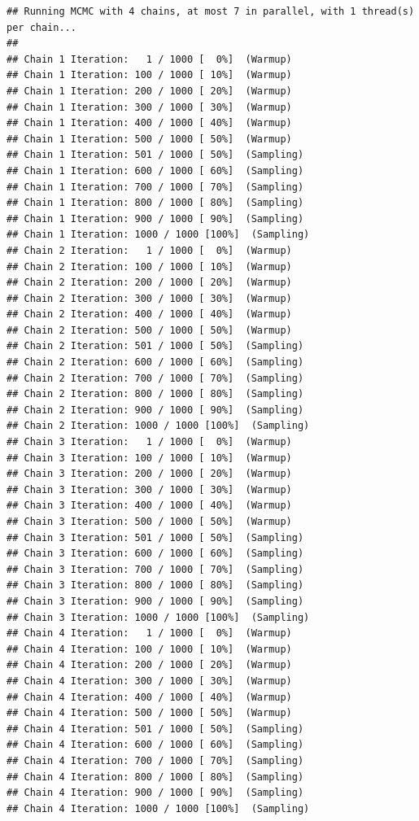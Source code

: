 \documentclass[
]{article}
\begin{document}
\begin{verbatim}
## Running MCMC with 4 chains, at most 7 in parallel, with 1 thread(s) per chain...
## 
## Chain 1 Iteration:   1 / 1000 [  0%]  (Warmup) 
## Chain 1 Iteration: 100 / 1000 [ 10%]  (Warmup) 
## Chain 1 Iteration: 200 / 1000 [ 20%]  (Warmup) 
## Chain 1 Iteration: 300 / 1000 [ 30%]  (Warmup) 
## Chain 1 Iteration: 400 / 1000 [ 40%]  (Warmup) 
## Chain 1 Iteration: 500 / 1000 [ 50%]  (Warmup) 
## Chain 1 Iteration: 501 / 1000 [ 50%]  (Sampling) 
## Chain 1 Iteration: 600 / 1000 [ 60%]  (Sampling) 
## Chain 1 Iteration: 700 / 1000 [ 70%]  (Sampling) 
## Chain 1 Iteration: 800 / 1000 [ 80%]  (Sampling) 
## Chain 1 Iteration: 900 / 1000 [ 90%]  (Sampling) 
## Chain 1 Iteration: 1000 / 1000 [100%]  (Sampling) 
## Chain 2 Iteration:   1 / 1000 [  0%]  (Warmup) 
## Chain 2 Iteration: 100 / 1000 [ 10%]  (Warmup) 
## Chain 2 Iteration: 200 / 1000 [ 20%]  (Warmup) 
## Chain 2 Iteration: 300 / 1000 [ 30%]  (Warmup) 
## Chain 2 Iteration: 400 / 1000 [ 40%]  (Warmup) 
## Chain 2 Iteration: 500 / 1000 [ 50%]  (Warmup) 
## Chain 2 Iteration: 501 / 1000 [ 50%]  (Sampling) 
## Chain 2 Iteration: 600 / 1000 [ 60%]  (Sampling) 
## Chain 2 Iteration: 700 / 1000 [ 70%]  (Sampling) 
## Chain 2 Iteration: 800 / 1000 [ 80%]  (Sampling) 
## Chain 2 Iteration: 900 / 1000 [ 90%]  (Sampling) 
## Chain 2 Iteration: 1000 / 1000 [100%]  (Sampling) 
## Chain 3 Iteration:   1 / 1000 [  0%]  (Warmup) 
## Chain 3 Iteration: 100 / 1000 [ 10%]  (Warmup) 
## Chain 3 Iteration: 200 / 1000 [ 20%]  (Warmup) 
## Chain 3 Iteration: 300 / 1000 [ 30%]  (Warmup) 
## Chain 3 Iteration: 400 / 1000 [ 40%]  (Warmup) 
## Chain 3 Iteration: 500 / 1000 [ 50%]  (Warmup) 
## Chain 3 Iteration: 501 / 1000 [ 50%]  (Sampling) 
## Chain 3 Iteration: 600 / 1000 [ 60%]  (Sampling) 
## Chain 3 Iteration: 700 / 1000 [ 70%]  (Sampling) 
## Chain 3 Iteration: 800 / 1000 [ 80%]  (Sampling) 
## Chain 3 Iteration: 900 / 1000 [ 90%]  (Sampling) 
## Chain 3 Iteration: 1000 / 1000 [100%]  (Sampling) 
## Chain 4 Iteration:   1 / 1000 [  0%]  (Warmup) 
## Chain 4 Iteration: 100 / 1000 [ 10%]  (Warmup) 
## Chain 4 Iteration: 200 / 1000 [ 20%]  (Warmup) 
## Chain 4 Iteration: 300 / 1000 [ 30%]  (Warmup) 
## Chain 4 Iteration: 400 / 1000 [ 40%]  (Warmup) 
## Chain 4 Iteration: 500 / 1000 [ 50%]  (Warmup) 
## Chain 4 Iteration: 501 / 1000 [ 50%]  (Sampling) 
## Chain 4 Iteration: 600 / 1000 [ 60%]  (Sampling) 
## Chain 4 Iteration: 700 / 1000 [ 70%]  (Sampling) 
## Chain 4 Iteration: 800 / 1000 [ 80%]  (Sampling) 
## Chain 4 Iteration: 900 / 1000 [ 90%]  (Sampling) 
## Chain 4 Iteration: 1000 / 1000 [100%]  (Sampling)
\end{verbatim}
\end{document}
